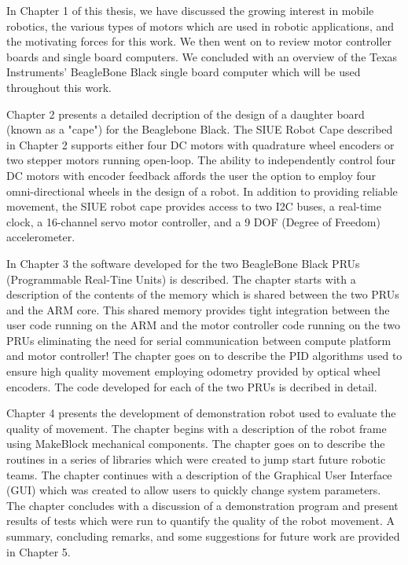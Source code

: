 \documentclass[12pt,oneside,final]{siuethesis}
\theoremstyle{definition}
\begin{document}
In Chapter 1 of this thesis, we have discussed the growing interest in mobile robotics, the various types of motors which are used in robotic applications, and the motivating forces for this work.  We then went on to review motor controller boards and single board computers. We concluded with an overview of the Texas Instruments' BeagleBone Black single board computer which will be used throughout this work.

Chapter 2 presents a detailed decription of the design of a daughter board (known as a "cape") for the Beaglebone Black.  The SIUE Robot Cape described in Chapter 2 supports either four DC motors with quadrature wheel encoders or two stepper motors running open-loop. The ability to independently control four DC motors with encoder feedback affords the user the option to employ four omni-directional wheels in the design of a robot. In addition to providing reliable movement, the SIUE robot cape provides access to two I2C buses, a real-time clock, a 16-channel servo motor controller, and a 9 DOF (Degree of Freedom) accelerometer. 

In Chapter 3 the software developed for the two BeagleBone Black PRUs (Programmable Real-Tine Units) is described.  The chapter starts with a description of the contents of the memory which is shared between the two PRUs and the ARM core. This shared memory provides tight integration between the user code running on the ARM and the motor controller code running on the two PRUs eliminating the need for serial communication between compute platform and motor controller! The chapter goes on to describe the PID algorithms used to ensure high quality movement employing odometry provided by optical wheel encoders. The code developed for each of the two PRUs is decribed in detail.

Chapter 4 presents the development of demonstration robot used to evaluate the quality of movement. The chapter begins with a description of the robot frame using MakeBlock mechanical components. The chapter goes on to describe the routines in a series of libraries which were created to jump start future robotic teams. The chapter continues with a description of the Graphical User Interface (GUI) which was created to allow users to quickly change system parameters. The chapter concludes with a discussion of a demonstration program and present results of tests which were run to quantify the quality of the robot movement. A summary, concluding remarks, and some suggestions for future work are provided in Chapter 5.
\end{document}
